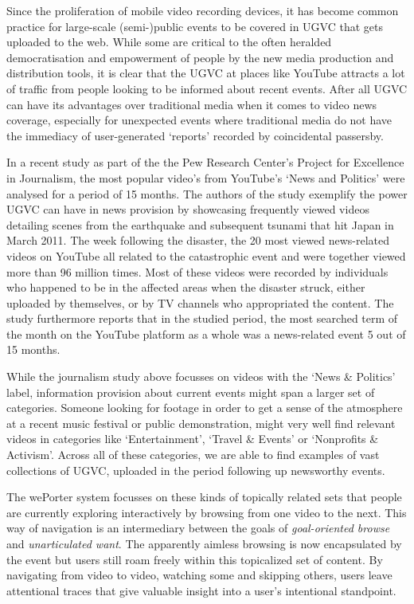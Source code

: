 Since the proliferation of mobile video recording devices, it has become common practice for large-scale (semi-)public events to be covered in UGVC that gets uploaded to the web. While some are critical\cite{Jonsson:2011fh} to the often heralded democratisation and empowerment of people by the new media production and distribution tools, it is clear that the UGVC at places like YouTube attracts a lot of traffic from people looking to be informed about recent events. After all UGVC can have its advantages over traditional media when it comes to video news coverage, especially for unexpected events where traditional media do not have the immediacy of user-generated `reports' recorded by coincidental passersby. 

In a recent study as part of the the Pew Research Center’s Project for Excellence in Journalism, the most popular video's from YouTube's `News and Politics' were analysed for a period of 15 months\cite{Rosenstiel:2012vb}. The authors of the study exemplify the power UGVC can have in news provision by showcasing frequently viewed videos detailing scenes from the earthquake and subsequent tsunami that hit Japan in March 2011. The week following the disaster, the 20 most viewed news-related videos on YouTube all related to the catastrophic event and were together viewed more than 96 million times. Most of these videos were recorded by individuals who happened to be in the affected areas when the disaster struck, either uploaded by themselves, or by TV channels who appropriated the content. The study furthermore reports that in the studied period, the most searched term of the month on the YouTube platform as a whole was a news-related event 5 out of 15 months.

While the journalism study above focusses on videos with the `News \& Politics' label, information provision about current events might span a larger set of categories. Someone looking for footage in order to get a sense of the atmosphere at a recent music festival or public demonstration, might very well find relevant videos in categories like `Entertainment', `Travel \& Events' or `Nonprofits \& Activism'. Across all of these categories, we are able to find examples of vast collections of UGVC, uploaded in the period following up newsworthy events.

The wePorter system focusses on these kinds of topically related sets that people are currently exploring interactively by browsing from one video to the next. This way of navigation is an intermediary between the goals of \textit{goal-oriented browse} and \textit{unarticulated want}. The apparently aimless browsing is now encapsulated by the event but users still roam freely within this topicalized set of content. By navigating from video to video, watching some and skipping others, users leave attentional traces that give valuable insight into a user's intentional standpoint.

